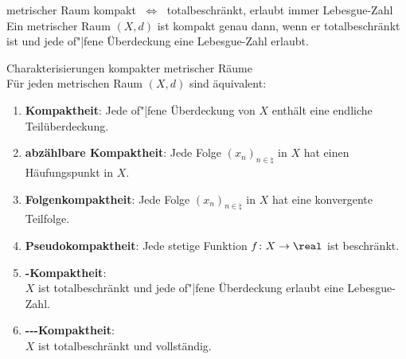 \begin{Satz}{metrischer Raum kompakt $\;\Leftrightarrow\;$
             totalbeschränkt, erlaubt immer Lebesgue-Zahl}\\
    Ein metrischer Raum $(X, d)$ ist kompakt genau dann, wenn er
    totalbeschränkt ist und jede of"|fene Überdeckung eine Lebesgue-Zahl
    erlaubt.
\end{Satz}

\begin{Satz}{Charakterisierungen kompakter metrischer Räume}\\
    Für jeden metrischen Raum $(X, d)$ sind äquivalent:
    \begin{enumerate}
        \item
        \textbf{Kompaktheit}:
        Jede of"|fene Überdeckung von $X$ enthält eine endliche
        Teilüberdeckung.

        \item
        \textbf{abzählbare Kompaktheit}:
        Jede Folge $(x_n)_{n \in \natural}$ in $X$ hat einen Häufungspunkt
        in $X$.

        \item
        \textbf{Folgenkompaktheit}:
        Jede Folge $(x_n)_{n \in \natural}$ in $X$ hat eine konvergente
        Teilfolge.

        \item
        \textbf{Pseudokompaktheit}:
        Jede stetige Funktion $f\colon X \rightarrow \real$ ist beschränkt.

        \item
        \textbf{-Kompaktheit}: \\
        $X$ ist totalbeschränkt und jede of"|fene Überdeckung erlaubt eine
        Lebesgue-Zahl.

        \item
        \textbf{---Kompaktheit}: \\
        $X$ ist totalbeschränkt und vollständig.
    \end{enumerate}
\end{Satz}

